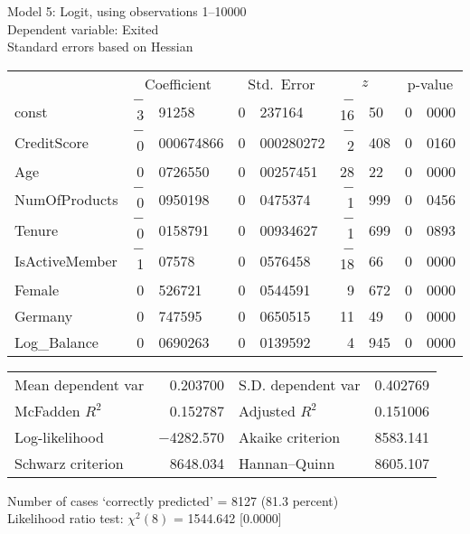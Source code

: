 \documentclass[11pt]{article}
\begin{document}
\thispagestyle{empty}

\begin{center}

Model 5: Logit, using observations 1--10000\\
Dependent variable: Exited\\
Standard errors based on Hessian

\vspace{1em}

\begin{tabular}{lr@{.}lr@{.}lr@{.}lr@{.}l}
  &
 \multicolumn{2}{c}{Coefficient} &
  \multicolumn{2}{c}{Std.\ Error} &
   \multicolumn{2}{c}{$z$} &
    \multicolumn{2}{c}{p-value} \\[1ex]
const &
  $-$3&91258 &
    0&237164 &
      $-$16&50 &
        0&0000 \\
CreditScore &
  $-$0&000674866 &
    0&000280272 &
      $-$2&408 &
        0&0160 \\
Age &
  0&0726550 &
    0&00257451 &
      28&22 &
        0&0000 \\
NumOfProducts &
  $-$0&0950198 &
    0&0475374 &
      $-$1&999 &
        0&0456 \\
Tenure &
  $-$0&0158791 &
    0&00934627 &
      $-$1&699 &
        0&0893 \\
IsActiveMember &
  $-$1&07578 &
    0&0576458 &
      $-$18&66 &
        0&0000 \\
Female &
  0&526721 &
    0&0544591 &
      9&672 &
        0&0000 \\
Germany &
  0&747595 &
    0&0650515 &
      11&49 &
        0&0000 \\
Log\_Balance &
  0&0690263 &
    0&0139592 &
      4&945 &
        0&0000 \\
\end{tabular}

\vspace{1ex}
\begin{tabular}{lrlr}
Mean dependent var &  0.203700 & S.D. dependent var &  0.402769 \\
McFadden $R^2$ &  0.152787 & Adjusted $R^2$ &  0.151006 \\
Log-likelihood & $-$4282.570 & Akaike criterion &  8583.141 \\
Schwarz criterion &  8648.034 & Hannan--Quinn &  8605.107 \\
\end{tabular}


\vspace{1ex}
\vspace{1em}
\begin{raggedright}
Number of cases `correctly predicted' = 8127 (81.3 percent)\\
Likelihood ratio test: $\chi^2(8)$ = 1544.642 [0.0000]\\
\end{raggedright}

\end{center}
\end{document}
